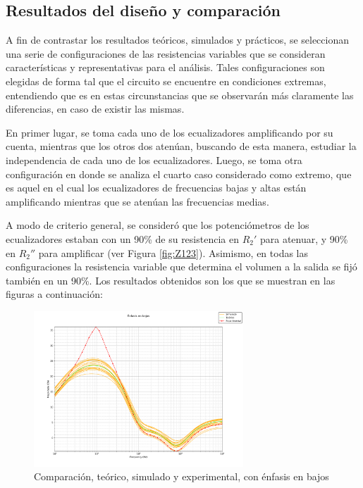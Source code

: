 \subsection{Resultados del diseño y comparación}
A fin de contrastar los resultados teóricos, simulados y prácticos, se seleccionan una serie de configuraciones de las resistencias variables que se consideran 
características y representativas para el análisis. 
Tales configuraciones son elegidas de forma tal que el circuito se encuentre en condiciones extremas, entendiendo que es en estas circunstancias que se observarán 
más claramente las diferencias, en caso de existir las mismas. \par
En primer lugar, se toma cada uno de los ecualizadores amplificando por su cuenta, mientras que los otros dos atenúan, buscando de esta manera, 
estudiar la independencia de cada uno de los ecualizadores.
Luego, se toma otra configuración en donde se analiza el cuarto caso considerado como extremo, que es aquel en el cual los ecualizadores de frecuencias bajas y altas 
están amplificando mientras que se atenúan las frecuencias medias. \par
A modo de criterio general, se consideró que los potenciómetros de los ecualizadores estaban con un 90\% de su resistencia en $R_2'$ para atenuar, y 90\% en $R_2''$ para 
amplificar (ver Figura \ref{fig:Z123}).
Asimismo, en todas las configuraciones la resistencia variable que determina el volumen a la salida se fijó también en un 90\%.
Los resultados obtenidos son los que se muestran en las figuras a continuación:

\begin{figure}[H]
    \centering
    \includegraphics[width=0.7\textwidth]{../EJ5/latex_resources/+B-M-A}
    \caption{Comparación, teórico, simulado y experimental, con énfasis en bajos}
    \label{fig:emphasis_in_low_ex}
\end{figure}

